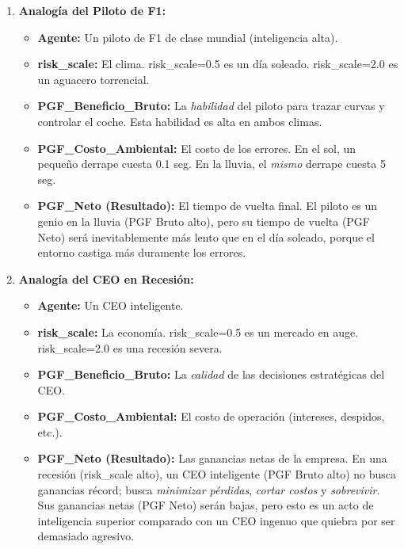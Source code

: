 \begin{enumerate}
\def\labelenumi{\arabic{enumi}.}
\item
  \textbf{Analogía del Piloto de F1:}

  \begin{itemize}
  \item
    \textbf{Agente:} Un piloto de F1 de clase mundial (inteligencia
    alta).
  \item
    \textbf{risk\_scale:} El clima. risk\_scale=0.5 es un día soleado.
    risk\_scale=2.0 es un aguacero torrencial.
  \item
    \textbf{PGF\_Beneficio\_Bruto:} La \emph{habilidad} del piloto para
    trazar curvas y controlar el coche. Esta habilidad es alta en ambos
    climas.
  \item
    \textbf{PGF\_Costo\_Ambiental:} El costo de los errores. En el sol,
    un pequeño derrape cuesta 0.1 seg. En la lluvia, el \emph{mismo}
    derrape cuesta 5 seg.
  \item
    \textbf{PGF\_Neto (Resultado):} El tiempo de vuelta final. El piloto
    es un genio en la lluvia (PGF Bruto alto), pero su tiempo de vuelta
    (PGF Neto) será inevitablemente más lento que en el día soleado,
    porque el entorno castiga más duramente los errores.
  \end{itemize}
\item
  \textbf{Analogía del CEO en Recesión:}

  \begin{itemize}
  \item
    \textbf{Agente:} Un CEO inteligente.
  \item
    \textbf{risk\_scale:} La economía. risk\_scale=0.5 es un mercado en
    auge. risk\_scale=2.0 es una recesión severa.
  \item
    \textbf{PGF\_Beneficio\_Bruto:} La \emph{calidad} de las decisiones
    estratégicas del CEO.
  \item
    \textbf{PGF\_Costo\_Ambiental:} El costo de operación (intereses,
    despidos, etc.).
  \item
    \textbf{PGF\_Neto (Resultado):} Las ganancias netas de la empresa.
    En una recesión (risk\_scale alto), un CEO inteligente (PGF Bruto
    alto) no busca ganancias récord; busca \emph{minimizar pérdidas},
    \emph{cortar costos} y \emph{sobrevivir}. Sus ganancias netas (PGF
    Neto) serán bajas, pero esto es un acto de inteligencia superior
    comparado con un CEO ingenuo que quiebra por ser demasiado agresivo.
  \end{itemize}
\end{enumerate}

